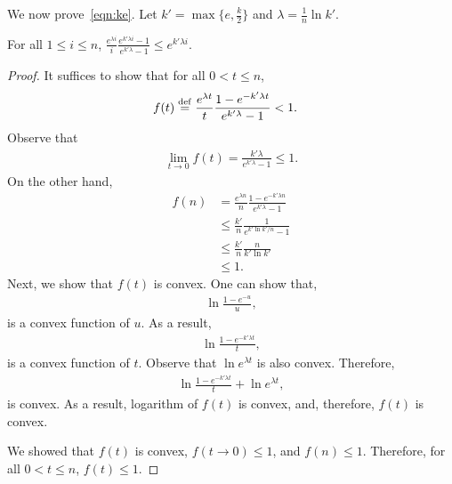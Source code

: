 \documentclass[twoside,11pt]{article}
\newcommand{\df}[1][\rm{def}]{\stackrel{#1}{=}}
\begin{document}
\noindent We now prove~\eqref{eqn:ke}.
Let $k'=\max\{e,\frac{k}{2}\}$ and $\lambda=\frac 1n\ln k'$. 
\begin{lemma}
\label{haha}
 For all $1\le i\le n$, $\frac{e^{\lambda i}}{i} \frac{e^{k'\lambda
     i}-1}{e^{k'\lambda}-1}\le e^{k'\lambda i} $.
\end{lemma}
\begin{proof}
 It suffices to show that for all $0<t\le n$,
\begin{align*}
 f(t)&\df\frac{e^{\lambda t}}{t} \frac{1-e^{-k'\lambda t}}{e^{k'\lambda}-1}<1.
\end{align*}
Observe that
\begin{align*}
 \lim_{t\to 0} f(t)=\frac{k'\lambda}{e^{k'\lambda}-1} \le 1.
\end{align*}
On the other hand,
\begin{align*}
 f(n)&=\frac{e^{\lambda n}}{n} \frac{1-e^{-k'\lambda n}}{e^{k'\lambda}-1}\\
 & \le \frac{k'}{n}\frac{1}{e^{k'\ln k'/n}-1}\\
 & \le \frac{k'}{n}\frac{n}{k'\ln k'}\\
 & \le 1.
\end{align*}
Next, we show that $f(t)$ is convex. One can show that,
\begin{align*}
 \ln \frac{1-e^{-u}}{u},
\end{align*}
is a convex function of $u$. As a result,
\begin{align*}
 \ln \frac{1-e^{-k'\lambda t}}{t},
\end{align*}
is a convex function of $t$. Observe that $\ln e^{\lambda t}$ is also
convex. Therefore,
\begin{align*}
 \ln \frac{1-e^{-k'\lambda t}}{t}+\ln e^{\lambda t},
\end{align*}
is convex. As a result, logarithm of $f(t)$ is convex, and, therefore,
$f(t)$ is convex.

We showed that $f(t)$ is convex, $f(t\to 0)\le 1$, and
$f(n)\le1$. Therefore, for all $0<t\le n$, $f(t)\le 1$.
\end{proof}

\end{document}

